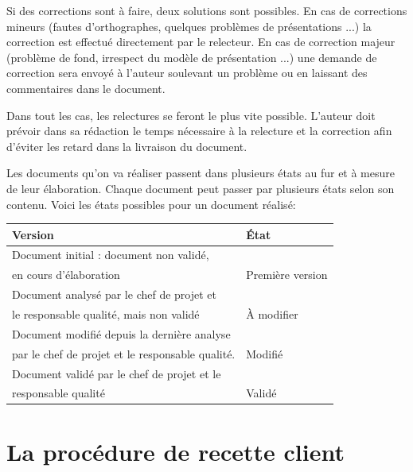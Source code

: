 Si des corrections sont à faire, deux solutions sont possibles.
En cas de corrections mineurs (fautes d’orthographes, quelques problèmes de présentations ...) la correction est effectué directement par le relecteur.
En cas de correction majeur (problème de fond, irrespect du modèle de présentation ...) une demande de correction sera envoyé à l’auteur soulevant un problème ou en laissant des commentaires dans le document.

Dans tout les cas, les relectures se feront le plus vite possible.
L’auteur doit prévoir dans sa rédaction le temps nécessaire à la relecture et la correction afin d’éviter les retard dans la livraison du document.

Les documents qu'on va réaliser passent dans plusieurs états au fur et à mesure de leur élaboration. Chaque document peut passer par plusieurs états selon son contenu. Voici les états possibles pour un document réalisé:


\begin{tabular}{ll}
    {\bf Version}                                                                                 & {\bf \'Etat}\\ \hline
    Document initial : document non validé,\\en cours d'élaboration                               & Première version \\ \hline
    Document analysé par le chef de projet et\\le responsable qualité, mais non validé            & \`A modifier \\ \hline
    Document modifié depuis la dernière analyse\\par le chef de projet et le responsable qualité. & Modifié \\ \hline
    Document validé par le chef de projet et le\\responsable qualité                              & Validé \\ \hline


\end{tabular}


\section{La procédure de recette client}

